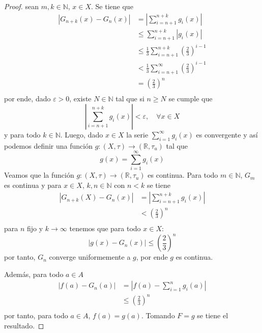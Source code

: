 \documentclass[12pt]{report}
\theoremstyle{largebreak}
\newcommand\abs[1]{\ensuremath{\left|#1\right|}}
\newcommand\cf[3]{\ensuremath{#1:#2\rightarrow#3}}
\begin{document}
\begin{proof}
        sean $m,k\in\mathbb{N}$, $x\in X$. Se tiene que
        \begin{equation*}
            \begin{split}
                \abs{G_{ n+k}(x)-G_n(x)}&=\abs{\sum_{ i=n+1}^{ n+k}g_i(x)}\\
                &\leq\sum_{ i=n+1}^{ n+k}\abs{g_i(x)}\\
                &\leq\frac{1}{3}\sum_{ i=n+1}^{ n+k}\left(\frac{2}{3}\right)^{ i-1}\\
                &<\frac{1}{3}\sum_{ i=n+1}^{\infty}\left(\frac{2}{3}\right)^{ i-1}\\
                &=\left(\frac{2}{3}\right)^n\\
            \end{split}
        \end{equation*}
        por ende, dado $\varepsilon>0$, existe $N\in\mathbb{N}$ tal que si $n\geq N$ se cumple que
        \begin{equation*}
            \abs{\sum_{ i=n+1}^{ n+k}g_i(x)}<\varepsilon,\quad\forall x\in X
        \end{equation*}
        y para todo $k\in\mathbb{N}$. Luego, dado $x\in X$ la serie $\sum_{ i=1}^\infty g_i(x)$ es convergente y así podemos definir una función $\cf{g}{(X,\tau)}{(\mathbb{R},\tau_u)}$ tal que
        \begin{equation*}
            g(x)=\sum_{ i=1}^\infty g_i(x)
        \end{equation*}
        Veamos que la función $\cf{g}{(X,\tau)}{(\mathbb{R},\tau_u)}$ es continua. Para todo $m\in\mathbb{N}$, $G_m$ es continua y para $x\in X$, $k,n\in\mathbb{N}$ con $n<k$ se tiene
        \begin{equation*}
            \begin{split}
                \abs{G_{n+k}(X)-G_n(x)}&=\abs{\sum_{ i=n+1}^{ n+k} g_i(x)}\\
                &<\left(\frac{2}{3}\right)^n\\
            \end{split}
        \end{equation*}
        para $n$ fijo y $k\rightarrow\infty$ tenemos que para todo $x\in X$:
        \begin{equation*}
            \abs{g(x)-G_n(x)}\leq\left(\frac{2}{3}\right)^n
        \end{equation*}
        por tanto, $G_n$ converge uniformemente a $g$, por ende $g$ es continua.

        Además, para todo $a\in A$
        \begin{equation*}
            \begin{split}
                \abs{f(a)-G_n(a)}&=\abs{f(a)-\sum_{ i=1}^n g_i(a)}\\
                &\leq\left(\frac{2}{3}\right)^n\\
            \end{split}
        \end{equation*}
        por tanto, para todo $a\in A$, $f(a)=g(a)$. Tomando $F=g$ se tiene el resultado.
    \end{proof}
\end{document}
